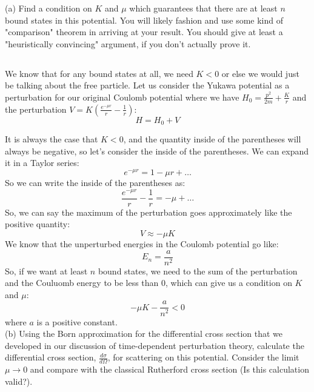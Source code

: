 \documentclass[12pt]{article}
\begin{document}
(a) Find a condition on $K$ and $\mu$ which guarantees that there are at least $n$ bound states in this potential. You will likely fashion and use some kind of "comparison" theorem in arriving at your result. You should give at least a "heuristically convincing" argument, if you don't actually prove it.
\subsection{}
We know that for any bound states at all, we need $K<0$ or else we would just be talking about the free particle. Let us consider the Yukawa potential as a perturbation for our original Coulomb potential where we have $H_0 = \frac{p^2}{2m} + \frac{K}{r}$ and the perturbation $V= K\left(\frac{e^{- \mu r}}{r} - \frac{1}{r}\right)$:
\begin{equation}
  H = H_0 + V
\end{equation}

It is always the case that $K<0$, and the quantity inside of the parentheses will always be negative, so let's consider the inside of the parentheses. We can expand it in a Taylor series:
\begin{equation}
  e^{-\mu r} = 1 - \mu r + \ldots
\end{equation}
So we can write the inside of the parentheses as:
\begin{equation}
  \frac{e^{-\mu r}}{r} - \frac{1}{r} = -\mu + \ldots
\end{equation}
So, we can say the maximum of the perturbation goes approximately like the positive quantity:
\begin{equation}
  V \approx -\mu K
\end{equation}
We know that the unperturbed energies in the Coulomb potential go like:
\begin{equation}
  E_n = \frac{a}{n^2}
\end{equation}
So, if we want at least $n$ bound states, we need to the sum of the perturbation and the Couluomb energy to be less than 0, which can give us a condition on $K$ and $\mu$:
\begin{equation}
  -\mu K - \frac{a}{n^2} < 0
\end{equation}
where $a$ is a positive constant.\\
(b) Using the Born approximation for the differential cross section that we developed in our discussion of time-dependent perturbation theory, calculate the differential cross section, $\frac{d \sigma}{d \Omega}$, for scattering on this potential. Consider the limit $\mu \rightarrow 0$ and compare with the classical Rutherford cross section (Is this calculation valid?).
\end{document}
